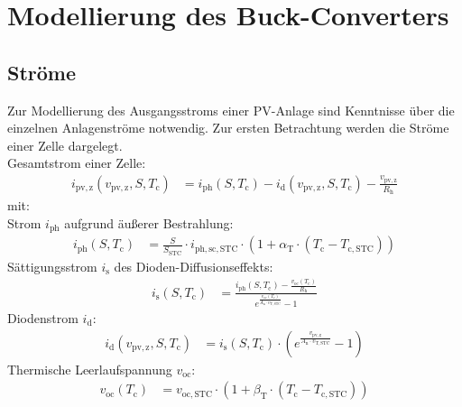 \section{Modellierung des Buck-Converters}
\label{sec:Modellierung}
\subsection{Ströme}
\label{sec:Stroeme}
Zur Modellierung des Ausgangsstroms einer PV-Anlage sind Kenntnisse über die einzelnen Anlagenströme notwendig. Zur ersten Betrachtung werden die Ströme einer Zelle dargelegt.\\
\newline
Gesamtstrom einer Zelle:
\begin{align}
    i_{\mathrm{pv,z}}(v_{\mathrm{pv,z}}, S, T_{\mathrm{c}}) &= i_{\mathrm{ph}}(S, T_{\mathrm{c}}) - i_{\mathrm{d}}(v_{\mathrm{pv,z}}, S, T_{\mathrm{c}}) - \frac{v_{\mathrm{pv,z}}}{R_{\mathrm{h}}}
    \label{eq:Gleichung1}
\end{align}
\newline
mit:\\
\newline
Strom $i_{\mathrm{ph}}$ aufgrund äußerer Bestrahlung:
\begin{align*}
    i_{\mathrm{ph}}(S, T_{\mathrm{c}}) &= \frac{S}{S_{\mathrm{STC}}}\cdot i_{\mathrm{ph,sc,STC}}\cdot\left(1+\alpha_{\mathrm{T}}\cdot\left(T_{\mathrm{c}}-T_{\mathrm{c,STC}}\right)\right)
\end{align*}
\newline
Sättigungsstrom $i_{\mathrm{s}}$ des Dioden-Diffusionseffekts:
\begin{align*}
    i_{\mathrm{s}}(S, T_{\mathrm{c}}) &= \frac{i_{\mathrm{ph}}(S, T_{\mathrm{c}})-\frac{v_{\mathrm{oc}}(T_{\mathrm{c}})}{R_{\mathrm{h}}}}{e^{\frac{v_{\mathrm{oc}}(T_{\mathrm{c}})}{A_{\mathrm{n}}\cdot v_{\mathrm{T,STC}}}}-1}
\end{align*}
\newline
Diodenstrom $i_{\mathrm{d}}$:
\begin{align*}
    i_{\mathrm{d}}(v_{\mathrm{pv,z}}, S, T_{\mathrm{c}}) &= i_{\mathrm{s}}(S, T_{\mathrm{c}})\cdot \left(e^{\frac{v_{\mathrm{pv,z}}}{A_{\mathrm{n}}\cdot v_{\mathrm{T,STC}}}}-1\right)
\end{align*}
\newline
Thermische Leerlaufspannung $v_{\mathrm{oc}}$:
\begin{align*}
    v_{\mathrm{oc}}(T_{\mathrm{c}}) &= v_{\mathrm{oc,STC}}\cdot\left(1+\beta_{\mathrm{T}}\cdot\left(T_{\mathrm{c}}-T_{\mathrm{c,STC}}\right)\right)
\end{align*}
